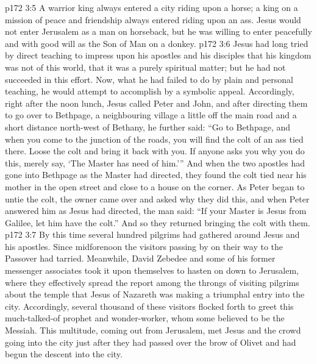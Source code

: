 \vs p172 3:5 \pc A warrior king always entered a city riding upon a horse; a king on a mission of peace and friendship always entered riding upon an ass. Jesus would not enter Jerusalem as a man on horseback, but he was willing to enter peacefully and with good will as the Son of Man on a donkey.
\vs p172 3:6 \pc Jesus had long tried by direct teaching to impress upon his apostles and his disciples that his kingdom was not of this world, that it was a purely spiritual matter; but he had not succeeded in this effort. Now, what he had failed to do by plain and personal teaching, he would attempt to accomplish by a symbolic appeal. Accordingly, right after the noon lunch, Jesus called Peter and John, and after directing them to go over to Bethpage, a neighbouring village a little off the main road and a short distance north\hyp{}west of Bethany, he further said: “Go to Bethpage, and when you come to the junction of the roads, you will find the colt of an ass tied there. Loose the colt and bring it back with you. If anyone asks you why you do this, merely say, ‘The Master has need of him.’” And when the two apostles had gone into Bethpage as the Master had directed, they found the colt tied near his mother in the open street and close to a house on the corner. As Peter began to untie the colt, the owner came over and asked why they did this, and when Peter answered him as Jesus had directed, the man said: “If your Master is Jesus from Galilee, let him have the colt.” And so they returned bringing the colt with them.
\vs p172 3:7 By this time several hundred pilgrims had gathered around Jesus and his apostles. Since midforenoon the visitors passing by on their way to the Passover had tarried. Meanwhile, David Zebedee and some of his former messenger associates took it upon themselves to hasten on down to Jerusalem, where they effectively spread the report among the throngs of visiting pilgrims about the temple that Jesus of Nazareth was making a triumphal entry into the city. Accordingly, several thousand of these visitors flocked forth to greet this much\hyp{}talked\hyp{}of prophet and wonder\hyp{}worker, whom some believed to be the Messiah. This multitude, coming out from Jerusalem, met Jesus and the crowd going into the city just after they had passed over the brow of Olivet and had begun the descent into the city.
